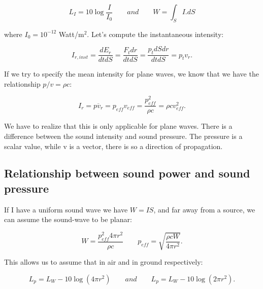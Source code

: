 	\begin{equation}
	L_I = 10\log \frac{I}{I_0} \qquad and \qquad W = \int _S I.dS
	\end{equation}
	
	where $I_0 = 10^{-12}$ Watt/m$^2$. 	Let's compute the instantaneous intensity: 
	
	\begin{equation}
	I_{r,inst} = \frac{dE_r}{dt dS} = \frac{F_t dr}{dt dS} = \frac{p_t dS dr}{dt dS} = p_t v_r.
	\end{equation}
	
	If we try to specify the mean intensity for plane waves, we know that we have the relationship $p/v = \rho c$:
	
	\begin{equation}
	I_r = \overline{pv_r} = p_{eff} v_{eff} = \frac{p^2_{eff}}{\rho c} = \rho c v_{eff}^2.
	\end{equation}
	
	We have to realize that this is only applicable for plane waves. There is a difference between the sound intensity and sound pressure. The pressure is a scalar value, while v is a vector, there is so a direction of propagation. 

\subsection{Relationship between sound power and sound pressure}	
	If I have a uniform sound wave we have $W=IS$, and far away from a source, we can assume the sound-wave to be planar: 
	
	\begin{equation}
	W = \frac{p^2_{eff} 4\pi r^2}{\rho c} \qquad p_{eff} = \sqrt{\frac{\rho c W}{4\pi r^2}}.
	\end{equation}
	
	This allows us to assume that in air and in ground respectively:
	
	\begin{equation}
	L_p = L_W - 10\log (4\pi r^2) \qquad and \qquad L_p = L_W - 10\log (2\pi r^2).
	\end{equation}
